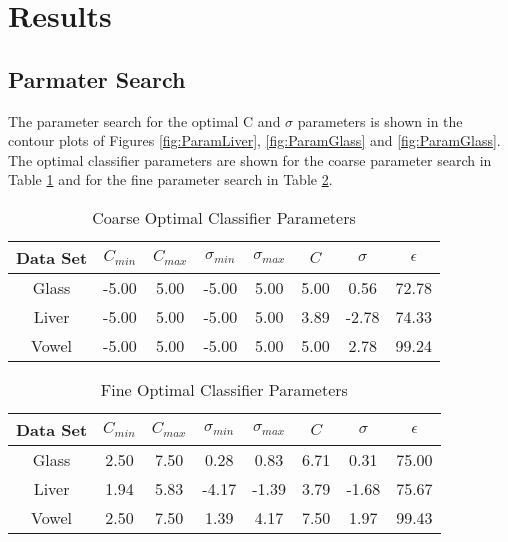 \section{Results}
\label{sec:Results}

\subsection{Parmater Search}

The parameter search for the optimal C and $\sigma$ parameters is shown in the contour plots of Figures \ref{fig:ParamLiver}, \ref{fig:ParamGlass} and \ref{fig:ParamGlass}.
The optimal classifier parameters are shown for the coarse parameter search in Table \ref{tab:CoarseParamValues} and for the fine parameter search in Table \ref{tab:FineParamValues}.
\begin{table}[h!]
\caption{Coarse Optimal Classifier Parameters}
\label{tab:CoarseParamValues}
\begin{tabular}{c c c c c c c c}
\hline
Data Set & $C_{min}$ & $C_{max}$ & $\sigma_{min}$ & $\sigma_{max}$ & $C$ & $\sigma$ & $\epsilon$ \\ 
\hline
Glass & -5.00 & 5.00 & -5.00 & 5.00 & 5.00 & 0.56 & 72.78 \\ 
Liver & -5.00 & 5.00 & -5.00 & 5.00 & 3.89 & -2.78 & 74.33 \\ 
Vowel & -5.00 & 5.00 & -5.00 & 5.00 & 5.00 & 2.78 & 99.24 \\ 
\hline
\end{tabular}
\end{table}
\begin{table}[ht]
\caption{Fine Optimal Classifier Parameters}
\label{tab:FineParamValues}
\begin{tabular}{c c c c c c c c}
Data Set & $C_{min}$ & $C_{max}$ & $\sigma_{min}$ & $\sigma_{max}$ & $C$ & $\sigma$ & $\epsilon$ \\ 
\hline
Glass & 2.50 & 7.50 & 0.28 & 0.83 & 6.71 & 0.31 & 75.00 \\ 
Liver & 1.94 & 5.83 & -4.17 & -1.39 & 3.79 & -1.68 & 75.67 \\ 
Vowel & 2.50 & 7.50 & 1.39 & 4.17 & 7.50 & 1.97 & 99.43 \\ 
\hline
\end{tabular}
\end{table}
